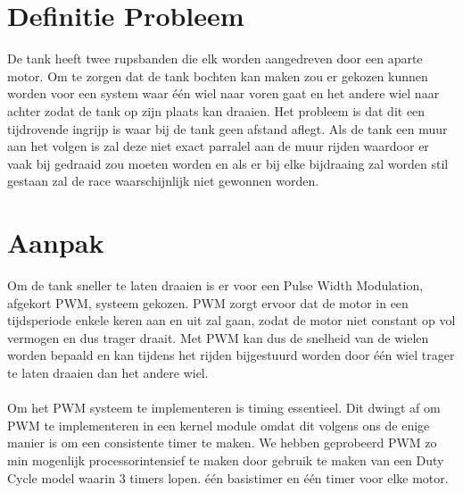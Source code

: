 \documentclass{report}
\begin{document}
\section{Definitie Probleem}
De tank heeft twee rupsbanden die elk worden aangedreven door een aparte motor. Om te zorgen dat de tank bochten kan maken zou er gekozen kunnen worden voor een system waar \'{e}\'{e}n wiel naar voren gaat en het andere wiel naar achter zodat de tank op zijn plaats kan draaien. Het probleem is dat dit een tijdrovende ingrijp is waar bij de tank geen afstand aflegt. Als de tank een muur aan het volgen is zal deze niet exact parralel aan de muur rijden waardoor er vaak bij gedraaid zou moeten worden en als er bij elke bijdraaing zal worden stil gestaan zal de race waarschijnlijk niet gewonnen worden.
\section{Aanpak}
Om de tank sneller te laten draaien is er voor een Pulse Width Modulation, afgekort PWM, systeem gekozen. PWM zorgt ervoor dat de motor in een tijdsperiode enkele keren aan en uit zal gaan, zodat de motor niet constant op vol vermogen en dus trager draait. Met PWM kan dus de snelheid van de wielen worden bepaald en kan tijdens het rijden bijgestuurd worden door \'{e}\'{e}n wiel trager te laten draaien dan het andere wiel.\\\\
 Om het PWM systeem te implementeren is timing essentieel. Dit dwingt af om PWM te implementeren in een kernel module omdat dit volgens ons de enige manier is om een consistente timer te maken. We hebben geprobeerd PWM zo min mogenlijk processorintensief te maken door gebruik te maken van een Duty Cycle model waarin 3 timers lopen. \'{e}\'{e}n basistimer en \'{e}\'{e}n timer voor elke motor. 
\end{document}
